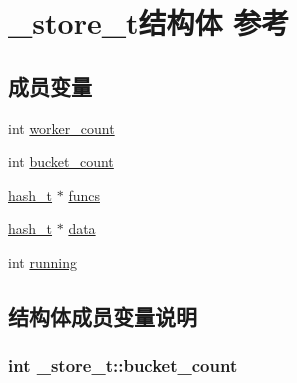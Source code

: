 \hypertarget{a00027}{}\section{\+\_\+store\+\_\+t结构体 参考}
\label{a00027}
\subsection*{成员变量}
\begin{DoxyCompactItemize}
\item 
int \hyperlink{a00027_a0a415188636dd2047d50c081a95a83e3_a0a415188636dd2047d50c081a95a83e3}{worker\+\_\+count}
\item 
int \hyperlink{a00027_aedacf361a2ea41e8d04613446ff8ccf7_aedacf361a2ea41e8d04613446ff8ccf7}{bucket\+\_\+count}
\item 
\hyperlink{a00044_a188677c3015513590ab998e96b999966_a188677c3015513590ab998e96b999966}{hash\+\_\+t} $\ast$ \hyperlink{a00027_a33bf893d1496890d7fc13963b98e344a_a33bf893d1496890d7fc13963b98e344a}{funcs}
\item 
\hyperlink{a00044_a188677c3015513590ab998e96b999966_a188677c3015513590ab998e96b999966}{hash\+\_\+t} $\ast$ \hyperlink{a00027_a160fc7e322a3146e8c7e6b48bec09400_a160fc7e322a3146e8c7e6b48bec09400}{data}
\item 
int \hyperlink{a00027_a3e871693b6a7728a9bd0c97a145a4bae_a3e871693b6a7728a9bd0c97a145a4bae}{running}
\end{DoxyCompactItemize}


\subsection{结构体成员变量说明}
\hypertarget{a00027_aedacf361a2ea41e8d04613446ff8ccf7_aedacf361a2ea41e8d04613446ff8ccf7}{}
\subsubsection[{bucket\+\_\+count}]{\setlength{\rightskip}{0pt plus 5cm}int \+\_\+store\+\_\+t\+::bucket\+\_\+count}\label{a00027_aedacf361a2ea41e8d04613446ff8ccf7_aedacf361a2ea41e8d04613446ff8ccf7}
\hypertarget{a00027_a160fc7e322a3146e8c7e6b48bec09400_a160fc7e322a3146e8c7e6b48bec09400}{}
